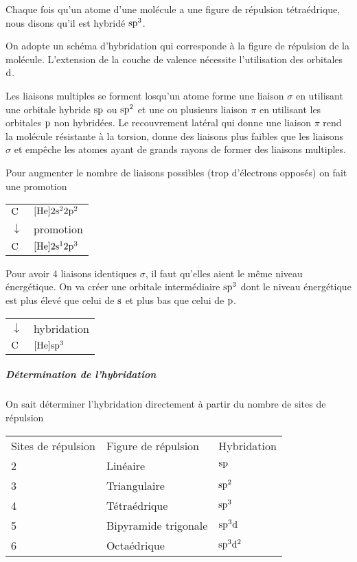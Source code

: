Chaque fois qu'un atome d'une molécule a une figure de répulsion tétraédrique,
nous disons qu'il est hybridé $\mathrm{s}\mathrm{p}^3$.

On adopte un schéma d'hybridation qui corresponde à la figure de répulsion de la molécule.
L'extension de la couche de valence nécessite l'utilisation des orbitales $\mathrm{d}$.

Les liaisons multiples se forment losqu'un atome forme une liaison $\sigma$ en utilisant une orbitale hybride $\mathrm{s}\mathrm{p}$ ou $\mathrm{s}\mathrm{p}^2$ et une ou plusieurs liaison $\pi$ en utilisant les orbitales $\mathrm{p}$ non hybridées.
Le recouvrement latéral qui donne une liaison $\pi$ rend la molécule résistante à la torsion,
donne des liaisons plus faibles que les liaisons $\sigma$ et empêche les atomes ayant de grands rayons de former des liaisons multiples.


Pour augmenter le nombre de liaisons possibles (trop d'électrons opposés) on fait une promotion
\begin{center}
  \begin{tabular}{ll}
    $\ce{C}$ & $[\ce{He}]2\sorb^22\porb^2$\\
    $\downarrow$ &  promotion\\
    $\ce{C}$ & $[\ce{He}]2\sorb^12\porb^3$
  \end{tabular}
\end{center}

Pour avoir 4 liaisons identiques $\sigma$, %
il faut qu'elles aient le même niveau énergétique.
On va créer une orbitale intermédiaire $\mathrm{s}\mathrm{p}^3$ dont le niveau énergétique est plus élevé que celui de $\mathrm{s}$ et plus bas que celui de $\mathrm{p}$.

\begin{center}
  \begin{tabular}{ll}
    $\downarrow$ &  hybridation\\
    $\ce{C}$ & $[\ce{He}]\sorb\porb^3$
  \end{tabular}
\end{center}

\subparagraph{Détermination de l'hybridation}
On sait déterminer l'hybridation directement à partir du nombre de sites de répulsion

\begin{center}
  \begin{tabular}{lll}
    Sites de répulsion & Figure de répulsion & Hybridation\\
    2 & Linéaire & $\mathrm{s}\mathrm{p}$\\
    3 & Triangulaire & $\mathrm{s}\mathrm{p}^2$\\
    4 & Tétraédrique & $\mathrm{s}\mathrm{p}^3$\\
    5 & Bipyramide trigonale & $\mathrm{s}\mathrm{p}^3\mathrm{d}$\\
    6 & Octaédrique & $\mathrm{s}\mathrm{p}^3\mathrm{d}^2$\\
  \end{tabular}
\end{center}

